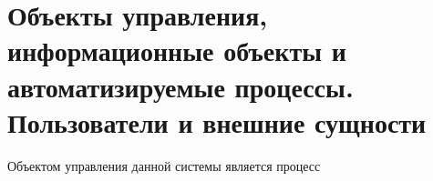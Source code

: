 \documentclass[../nirs.tex]{subfiles}
\begin{document}
\section{Объекты управления, информационные объекты и автоматизируемые процессы.
	Пользователи и внешние сущности}
Объектом управления данной системы является процесс 
\end{document}
